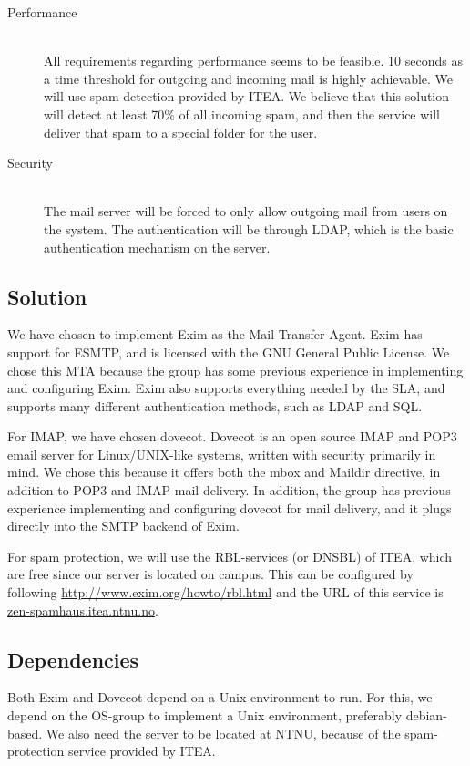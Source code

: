 \documentclass[12pt]{article}
\begin{document}
\begin{description}
\item[Performance] \hfill \\
All requirements regarding performance seems to be feasible. 10 seconds
as a time threshold for outgoing and incoming mail is highly achievable.
We will use spam-detection provided by ITEA. We believe that this
solution will detect at least 70\% of all incoming spam, and then the
service will deliver that spam to a special folder for the user.

\item[Security] \hfill \\
The mail server will be forced to only allow outgoing mail from users on
the system. The authentication will be through LDAP, which is the basic
authentication mechanism on the server.

\end{description}
\subsection{Solution}

We have chosen to implement Exim\cite{exim} as the Mail Transfer Agent. Exim has
support for ESMTP, and is licensed with the GNU General Public
License\cite{gnu-license}. We chose this MTA because the group has some previous
experience in implementing and configuring Exim. Exim also supports
everything needed by the SLA, and supports many different authentication
methods, such as LDAP and SQL. 

For IMAP, we have chosen dovecot. Dovecot is an open source IMAP and
POP3 email server for Linux/UNIX-like systems, written with security
primarily in mind\cite{dovecot}. We chose this because it offers both the mbox and
Maildir directive, in addition to POP3 and IMAP mail delivery. In
addition, the group has previous experience implementing and configuring
dovecot for mail delivery, and it plugs directly into the SMTP backend
of Exim.

For spam protection, we will use the RBL-services (or DNSBL) of ITEA,
which are free since our server is located on campus. This can be
configured by following \url{http://www.exim.org/howto/rbl.html} and the URL
of this service is \url{zen-spamhaus.itea.ntnu.no}.

\subsection{Dependencies}
Both Exim and Dovecot depend on a Unix environment to run. For this, we
depend on the OS-group to implement a Unix environment, preferably
debian-based.
We also need the server to be located at NTNU, because of the
spam-protection service provided by ITEA. 

\newpage


\end{document}
